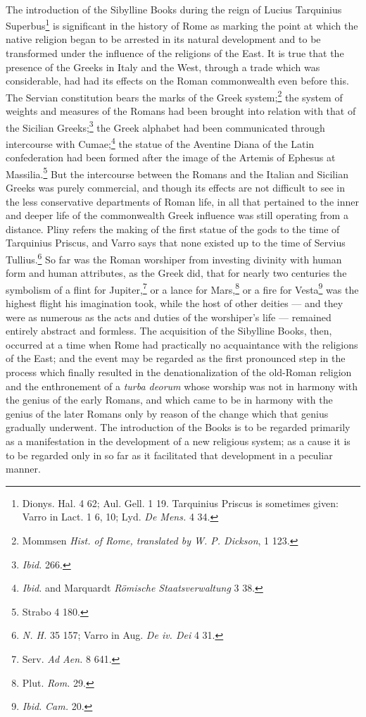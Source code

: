 \documentclass[a4paper, 11pt, oneside, polutonikogreek, english]{article}
\begin{document}
\paragraph{}
The introduction of the Sibylline Books during the reign of Lucius Tarquinius Superbus\footnote{Dionys. Hal. 4 62; Aul. Gell. 1 19. Tarquinius Priscus is sometimes given: Varro in Lact. 1 6, 10; Lyd. \emph{De Mens.} 4 34.} is significant in the history of Rome as marking the point at which the native religion began to be arrested in its natural development and to be transformed under the influence of the religions of the East. It is true that the presence of the Greeks in Italy and the West, through a trade which was considerable, had had its effects on the Roman commonwealth even before this. The Servian constitution bears the marks of the Greek system;\footnote{Mommsen \emph{Hist. of Rome, translated by W. P. Dickson}, 1 123.} the system of weights and measures of the Romans had been brought into relation with that of the Sicilian Greeks;\footnote{\emph{Ibid.} 266.} the Greek alphabet had been communicated through intercourse with Cumae;\footnote{\emph{Ibid.} and Marquardt \emph{Römische Staatsverwaltung} 3 38.} the statue of the Aventine Diana of the Latin confederation had been formed after the image of the Artemis of Ephesus at Massilia.\footnote{Strabo 4 180.} But the intercourse between the Romans and the Italian and Sicilian Greeks was purely commercial, and though its effects are not difficult to see in the less conservative departments of Roman life, in all that pertained to the inner and deeper life of the commonwealth Greek influence was still operating from a distance. Pliny refers the making of the first statue of the gods to the time of Tarquinius Priscus, and Varro says that none existed up to the time of Servius Tullius.\footnote{\emph{N. H.} 35 157; Varro in Aug. \emph{De iv. Dei} 4 31.} So far was the Roman worshiper from investing divinity with human form and human attributes, as the Greek did, that for nearly two centuries the symbolism of a flint for Jupiter,\footnote{Serv. \emph{Ad Aen.} 8 641.} or a lance for Mars,\footnote{Plut. \emph{Rom.} 29.} or a fire for Vesta\footnote{\emph{Ibid.} \emph{Cam.} 20.} was the highest flight his imagination took, while the host of other deities --- and they were as numerous as the acts and duties of the worshiper's life --- remained entirely abstract and formless. The acquisition of the Sibylline Books, then, occurred at a time when Rome had practically no acquaintance with the religions of the East; and the event may be regarded as the first pronounced step in the process which finally resulted in the denationalization of the old-Roman religion and the enthronement of a \emph{turba deorum} whose worship was not in harmony with the genius of the early Romans, and which came to be in harmony with the genius of the later Romans only by reason of the change which that genius gradually underwent. The introduction of the Books is to be regarded primarily as a manifestation in the development of a new religious system; as a cause it is to be regarded only in so far as it facilitated that development in a peculiar manner.
\end{document}
